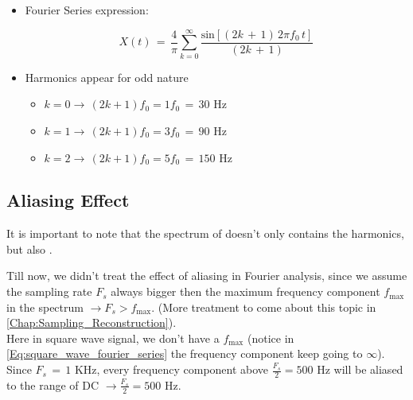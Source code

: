 \begin{itemize}
    \item Fourier Series expression: 
    
    \begin{equation}
        X(t) \, = \, \displaystyle\frac{4}{\pi} \displaystyle\sum_{k = 0}^\infty \displaystyle\frac{\text{sin}\left[ (2 k \, + \, 1) \, 2 \pi f_0 \, t \right]}{(2 k \, + \, 1)}
        \label{Eq:square_wave_fourier_series}
    \end{equation}
    
    
    \item Harmonics appear for odd nature
    
    \begin{itemize}
        \item $k = 0 \rightarrow \, (2k + 1) f_0 =  1 f_0 \, = \, 30$ Hz
        
        \item $k = 1 \rightarrow \, (2k + 1) f_0 =  3 f_0 \, = \, 90$ Hz
        
        \item $k = 2 \rightarrow \, (2k + 1) f_0 =  5 f_0 \, = \, 150$ Hz
        
    \end{itemize}
    
\end{itemize}

\subsection{Aliasing Effect}

It is important to note that the spectrum of doesn't only contains the harmonics, but also .

Till now, we didn't treat the effect of aliasing in Fourier analysis, since we assume the sampling rate $F_s$ always bigger then the maximum frequency component $f_{\text{max}}$ in the spectrum $\rightarrow F_s > f_{\text{max}}$. (More  treatment to come about this topic in \autoref{Chap:Sampling_Reconstruction}).\\

Here in square wave signal, we don't have a $f_{\text{max}}$ (notice in \autoref{Eq:square_wave_fourier_series} the frequency component keep going to $\infty$). Since $F_s \, = \, 1$ KHz, every frequency component above $\displaystyle\frac{F_s}{2} = 500$ Hz will be aliased to the range of DC $\rightarrow \displaystyle\frac{F_s}{2} = 500$ Hz.

